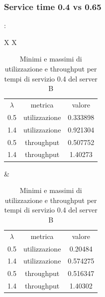 \subsubsection{Service time 0.4 vs 0.65}
\begin{frame}{\subsecname: \subsubsecname}
    \begin{table}
        \centering
        \begin{tabularx}{\textwidth}{X X}
            \begin{minipage}{0.48\textwidth}
                \centering
                \caption{Minimi e massimi di utilizzazione e throughput per tempi di servizio 0.65 del server B}
                \begin{tabular}{ccc}
                    $\lambda$ & metrica & valore\\
                    0.5 & utilizzazione & 0.333898\\
                    1.4 & utilizzazione & 0.921304\\
                    0.5 & throughput & 0.507752\\
                    1.4 & throughput & 1.40273
                \end{tabular}
                \label{tab:065_metrics}
            \end{minipage}
            &
            \begin{minipage}{0.48\textwidth}
                \centering
                \caption{Minimi e massimi di utilizzazione e throughput per tempi di servizio 0.4 del server B}
                \begin{tabular}{ccc}
                    $\lambda$ & metrica & valore\\
                    0.5 & utilizzazione & 0.20484\\
                    1.4 & utilizzazione & 0.574275\\
                    0.5 & throughput & 0.516347\\
                    1.4 & throughput & 1.40302
                \end{tabular}
                \label{tab:04_metrics}
            \end{minipage}
        \end{tabularx}
    \end{table}
\end{frame}

